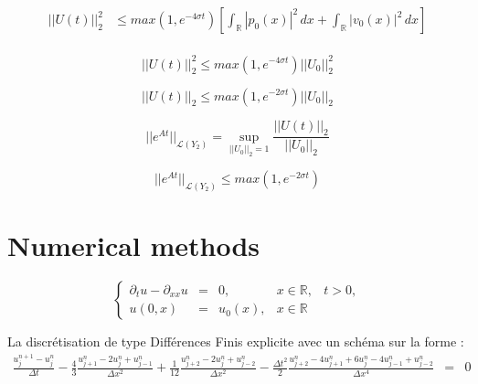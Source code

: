 \documentclass[a4paper,11pt]{article}
\begin{document}
\begin{equation*}
\begin{split}
    ||U(t)||^{2}_{2} & \le max(1, e^{-4\sigma t}) \left[ \int_{\mathbb{R}}|p_0(x)|^{2} \,dx + \int_{\mathbb{R}} |v_0(x)|^{2} \,dx \right] \\
\end{split}
\end{equation*}


\begin{equation*}
    ||U(t)||^{2}_{2} \le max(1, e^{-4\sigma t}) ||U_{0}||^{2}_{2}
\end{equation*}

\begin{equation*}
    ||U(t)||_{2} \le max(1, e^{-2\sigma t}) ||U_{0}||_{2}
\end{equation*}

\begin{equation*}
||e^{At}||_{\mathcal{L}(Y_{2})} = \sup_{||U_{0}||_{2} = 1}\frac{||U(t)||_{2}}{||U_{0}||_{2}}
\end{equation*}

\begin{equation*}
    ||e^{At}||_{\mathcal{L}(Y_{2})} \le max(1, e^{-2\sigma t})
\end{equation*}








\section{Numerical methods}

\begin{equation}
    \left\{
    \begin{array}{rclll}
        \partial_{t}u - \partial_{xx}u &=& 0, &x \in \mathbb{R}, & t>0, \\
        u(0, x) &=& u_{0}(x), &x \in \mathbb{R} &
    \end{array}
    \right.
\end{equation}

La discrétisation de type Différences Finis explicite avec un schéma sur la forme :
\begin{equation}
    \begin{array}{rcl}
        \frac{u^{n+1}_{j} - u^{n}_{j}}{\Delta t}
        -\frac{4}{3} \frac{u^{n}_{j+1} - 2u^{n}_{j} + u^{n}_{j-1}}{\Delta x^{2}}
        +\frac{1}{12} \frac{u^{n}_{j+2} - 2u^{n}_{j} + u^{n}_{j-2}}{\Delta x^{2}}
        -\frac{\Delta t^{2}}{2} \frac{u^{n}_{j+2} - 4u^{n}_{j+1} + 6u^{n}_{j}  - 4u^{n}_{j-1} + u^{n}_{j-2}}{\Delta x^{4}}  &=& 0 \label{scheme}
    \end{array}
\end{equation}
\end{document}
